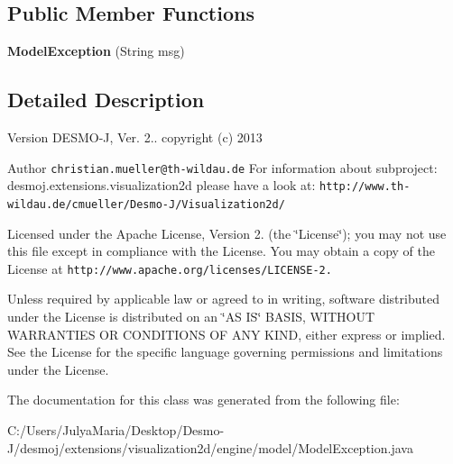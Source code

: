 \subsection*{Public Member Functions}
\begin{DoxyCompactItemize}
\item 
{\bfseries Model\-Exception} (String msg)\label{classdesmoj_1_1extensions_1_1visualization2d_1_1engine_1_1model_1_1_model_exception_a6ab9fe327d92b66d0ac185886f73eeaf}

\end{DoxyCompactItemize}


\subsection{Detailed Description}
\begin{DoxyVersion}{Version}
D\-E\-S\-M\-O-\/\-J, Ver. 2.. copyright (c) 2013 
\end{DoxyVersion}
\begin{DoxyAuthor}{Author}
{\tt christian.\-mueller@th-\/wildau.\-de} For information about subproject\-: desmoj.\-extensions.\-visualization2d please have a look at\-: {\tt http\-://www.\-th-\/wildau.\-de/cmueller/\-Desmo-\/\-J/\-Visualization2d/}
\end{DoxyAuthor}
Licensed under the Apache License, Version 2. (the \char`\"{}\-License\char`\"{}); you may not use this file except in compliance with the License. You may obtain a copy of the License at {\tt http\-://www.\-apache.\-org/licenses/\-L\-I\-C\-E\-N\-S\-E-\/2.}

Unless required by applicable law or agreed to in writing, software distributed under the License is distributed on an \char`\"{}\-A\-S I\-S\char`\"{} B\-A\-S\-I\-S, W\-I\-T\-H\-O\-U\-T W\-A\-R\-R\-A\-N\-T\-I\-E\-S O\-R C\-O\-N\-D\-I\-T\-I\-O\-N\-S O\-F A\-N\-Y K\-I\-N\-D, either express or implied. See the License for the specific language governing permissions and limitations under the License. 

The documentation for this class was generated from the following file\-:\begin{DoxyCompactItemize}
\item 
C\-:/\-Users/\-Julya\-Maria/\-Desktop/\-Desmo-\/\-J/desmoj/extensions/visualization2d/engine/model/Model\-Exception.\-java\end{DoxyCompactItemize}
